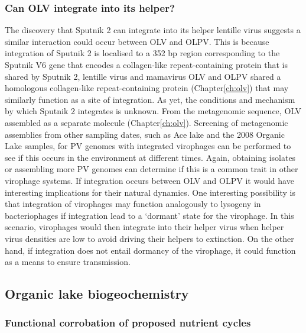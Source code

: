 \subsubsection{Can \ac{OLV} integrate into its helper?} 
The discovery that Sputnik 2 can integrate into its helper lentille virus suggests a similar interaction could occur between \ac{OLV} and \ac{OLPV}.
This is because integration of Sputnik 2 is localised to a 352 bp region corresponding to the Sputnik V6 gene that encodes a collagen-like repeat-containing protein that is shared by Sputnik 2, lentille virus and mamavirus  \cite{Desnues2012} 
\ac{OLV} and \ac{OLPV} shared a homologous collagen-like repeat-containing protein (Chapter\ref{ch:olv}) that may similarly function as a site of integration.
As yet, the conditions and mechanism by which Sputnik 2 integrates is unknown.
From the metagenomic sequence, \ac{OLV} assembled as a separate molecule (Chapter\ref{ch:olv}).
Screening of metagenomic assemblies from other sampling dates, such as Ace lake and the 2008 Organic Lake samples, for \ac{PV} genomes with integrated virophages can be performed to see if this occurs in the environment at different times.
Again, obtaining isolates or assembling more \ac{PV} genomes can determine if this is a common trait in other virophage systems.
If integration occurs between \ac{OLV} and \ac{OLPV} it would have interesting implications for their natural dynamics.
One interesting possibility is that integration of virophages may function analogously to lysogeny in bacteriophages if integration lead to a `dormant' state for the virophage.
In this scenario, virophages would then integrate into their helper virus when helper virus densities are low to avoid driving their helpers to extinction.
On the other hand, if integration does not entail dormancy of the virophage, it could function as a means to ensure transmission.



\subsection{Organic lake biogeochemistry}

\subsubsection{Functional corrobation of proposed nutrient cycles}

